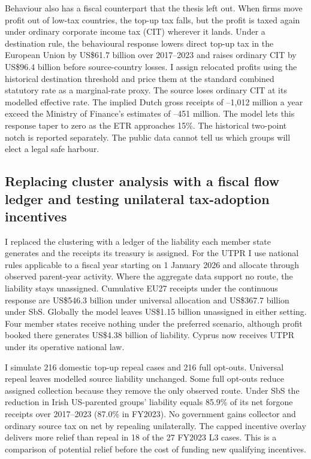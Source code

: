 \documentclass[11pt,a4paper]{article}
\newcommand{\EUR}{\texteuro}
\newcommand{\usd}{US\$}
\begin{document}
Behaviour also has a fiscal counterpart that the thesis left out. When firms move profit out of low-tax countries, the top-up tax falls, but the profit is taxed again under ordinary corporate income tax (CIT) wherever it lands. Under a destination rule, the behavioural response lowers direct top-up tax in the European Union by \usd61.7 billion over 2017–2023 and raises ordinary CIT by \usd96.4 billion before source-country losses. I assign relocated profits using the historical destination threshold and price them at the standard combined statutory rate as a marginal-rate proxy. The source loses ordinary CIT at its modelled effective rate. The implied Dutch gross receipts of \EUR628–1,012 million a year exceed the Ministry of Finance's estimates of \EUR397–451 million. The model lets this response taper to zero as the ETR approaches 15\%. The historical two-point notch is reported separately. The public data cannot tell us which groups will elect a legal safe harbour.

\subsection{Replacing cluster analysis with a fiscal flow ledger and testing unilateral tax-adoption incentives}

I replaced the clustering with a ledger of the liability each member state generates and the receipts its treasury is assigned. For the UTPR I use national rules applicable to a fiscal year starting on 1 January 2026 and allocate through observed parent-year activity. Where the aggregate data support no route, the liability stays unassigned. Cumulative EU27 receipts under the continuous response are \usd546.3 billion under universal allocation and \usd367.7 billion under SbS. Globally the model leaves \usd1.15 billion unassigned in either setting. Four member states receive nothing under the preferred scenario, although profit booked there generates \usd4.38 billion of liability. Cyprus now receives UTPR under its operative national law.

I simulate 216 domestic top-up repeal cases and 216 full opt-outs. Universal repeal leaves modelled source liability unchanged. Some full opt-outs reduce assigned collection because they remove the only observed route. Under SbS the reduction in Irish US-parented groups' liability equals 85.9\% of its net forgone receipts over 2017–2023 (87.0\% in FY2023). No government gains collector and ordinary source tax on net by repealing unilaterally. The capped incentive overlay delivers more relief than repeal in 18 of the 27 FY2023 L3 cases. This is a comparison of potential relief before the cost of funding new qualifying incentives.
\end{document}
